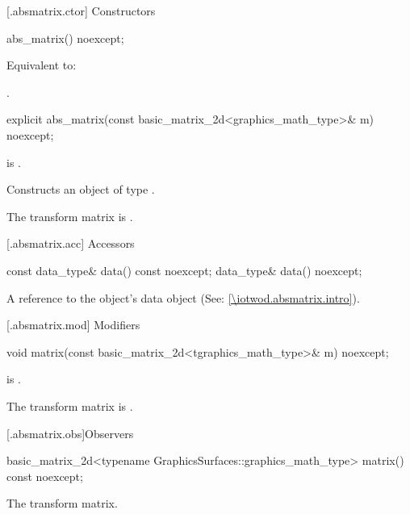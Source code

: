  [\iotwod.absmatrix.ctor] {Constructors}%

%
\begin{itemdecl}
abs_matrix() noexcept;
\end{itemdecl}
\begin{itemdescr}
\pnum
\effects Equivalent to:  

\pnum
\postconditions {}.
\end{itemdescr}

%
\begin{itemdecl}
explicit abs_matrix(const basic_matrix_2d<graphics_math_type>& m) noexcept;
\end{itemdecl}
\begin{itemdescr}
\pnum
\requires {} is .

\pnum
\effects Constructs an object of type .

\pnum
\remarks The transform matrix is .
\end{itemdescr}

 [\iotwod.absmatrix.acc] {Accessors}%

%
\begin{itemdecl}
const data_type& data() const noexcept;
data_type& data() noexcept;
\end{itemdecl}
\begin{itemdescr}
\pnum
\returns A reference to the  object's data object (See: \ref{\iotwod.absmatrix.intro}).
\end{itemdescr}

 [\iotwod.absmatrix.mod] {Modifiers}%

%
\begin{itemdecl}
void matrix(const basic_matrix_2d<tgraphics_math_type>& m) noexcept;
\end{itemdecl}
\begin{itemdescr}
\pnum
\requires {} is .

\pnum
\effects The transform matrix is .
\end{itemdescr}

 [\iotwod.absmatrix.obs]{Observers}%

%
\begin{itemdecl}
basic_matrix_2d<typename GraphicsSurfaces::graphics_math_type> matrix() const noexcept;
\end{itemdecl}
\begin{itemdescr}
\pnum
\returns The transform matrix.
\end{itemdescr}

